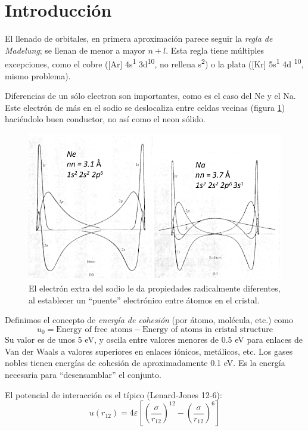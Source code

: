 \section{Introducción}
El llenado de orbitales, en primera aproximación parece seguir la
\emph{regla de Madelung}; se llenan de menor a mayor $n+l$. Esta regla
tiene múltiples excepciones, como el cobre ([Ar] 4s\textsuperscript{1} 3d\textsuperscript{10}, no
rellena s\textsuperscript 2) o la plata ([Kr] 5s\textsuperscript 1 4d \textsuperscript{10}, mismo problema).

Diferencias de un sólo electron son importantes, como es el caso del
Ne y el Na. Este electrón de más en el sodio se deslocaliza entre
celdas vecinas (figura \ref{fig:nena}) haciéndolo buen conductor, no
así como el neon sólido.
\begin{figure}
  \centering
  \includegraphics[width=\textwidth]{figures/nena.png}
  \caption{El electrón extra del sodio le da propiedades radicalmente
    diferentes, al establecer un ``puente'' electrónico entre átomos
    en el cristal.}
  \label{fig:nena}
\end{figure}

Definimos el concepto de \emph{energía de cohesión} (por átomo,
molécula, etc.) como
\begin{equation}
  u_0 = \text{Energy of free atoms} - \text{Energy of atoms in cristal
  structure}
\end{equation}
Su valor es de unos 5 eV, y oscila entre valores menores de 0.5 eV
para enlaces de Van der Waals a valores superiores en enlaces iónicos,
metálicos, etc. Los gases nobles tienen energías de cohesión de
aproximadamente 0.1 eV. Es la energía necesaria para ``desensamblar''
el conjunto.

El potencial de interacción es el típico (Lenard-Jones
12-6):
\begin{equation}
  \label{eq:lj126}
  u(r_{12}) = 4\varepsilon \left[ \left(\frac{\sigma}{r_{12}}
    \right)^{12} - \left(\frac{\sigma}{r_{12}} \right)^6 \right]
\tag{LJ 12-6}
\end{equation}

